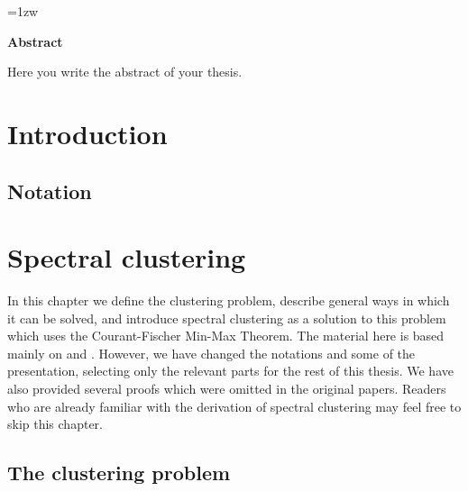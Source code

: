 \thispagestyle{empty}
\vspace*{20pt plus 1fil}
\parindent=1zw
\noindent
\begin{center}
{\Large \bf Abstract}
\vspace{2cm}
\end{center}
Here you write the abstract of your thesis.

\par
\vspace{0pt plus 1fil}
\newpage

\tableofcontents
\listoffigures

\pagebreak \setcounter{page}{1}


\chapter{Introduction}


\section{Notation}

\chapter{Spectral clustering}
In this chapter we define the clustering problem, describe general ways in which it can be solved, and introduce
spectral clustering as a solution to this problem which uses the Courant-Fischer Min-Max Theorem.
The material here is based mainly on \cite{ng} and \cite{tutorial}.
However, we have changed the notations and some of the presentation, selecting only the relevant parts for the rest of this thesis.
We have also provided several proofs which were omitted in the original papers.
Readers who are already familiar with the derivation of spectral clustering may feel free to skip this chapter. 

\section{The clustering problem}

